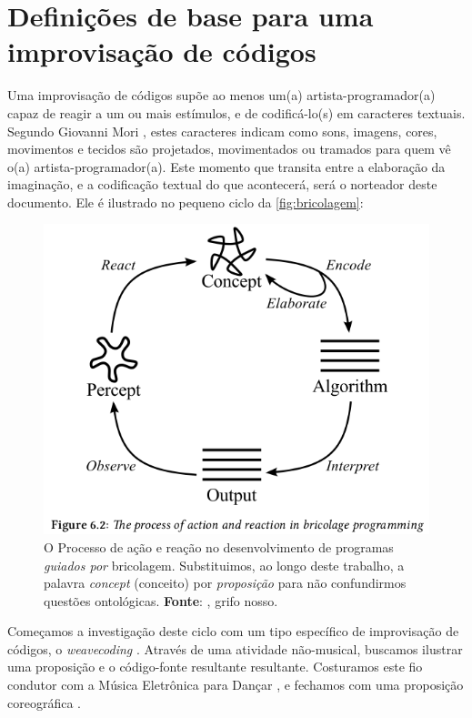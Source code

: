 \chapter{Definições de base para uma improvisação de códigos}\label{cap:introducao}

Uma improvisação de códigos supõe ao menos um(a) artista-programador(a) capaz de reagir a um ou mais estímulos, e de codificá-lo(s) em caracteres textuais. Segundo Giovanni Mori , estes caracteres indicam como sons, imagens, cores, movimentos e tecidos são projetados, movimentados ou tramados  para quem vê o(a) artista-programador(a). Este momento que transita entre a elaboração da imaginação, e a codificação textual do que acontecerá, será o norteador deste documento. Ele é ilustrado no pequeno ciclo da \autoref{fig:bricolagem}:

\begin{figure}[!h]
  \centering
  \includegraphics[scale=0.5]{./imagens/processo_criativo.png}
  \caption{O Processo de ação e reação no desenvolvimento de programas \emph{guiados por} bricolagem. Substituimos, ao longo deste trabalho, a palavra \emph{concept} (conceito) por \emph{proposição} para não confundirmos questões ontológicas. \textbf{Fonte}: \cite[p.~122]{McLean2011}, grifo nosso.}
  \label{fig:bricolagem}
\end{figure}

Começamos a investigação deste ciclo com um tipo específico de improvisação de códigos, o \emph{weavecoding} . Através de uma atividade  não-musical, buscamos ilustrar uma proposição e o código-fonte resultante resultante. Costuramos este fio condutor com a Música Eletrônica para Dançar , e fechamos com uma proposição coreográfica .



